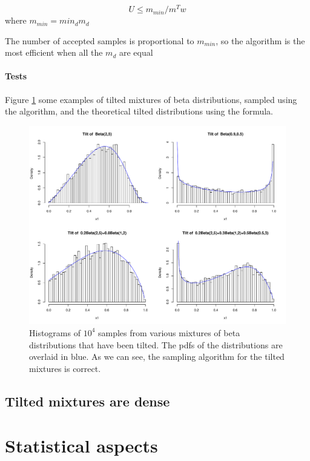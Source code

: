 \documentclass[10pt]{report}
\begin{document}
$$
U\leq m_{min}/m^Tw
$$
where $m_{min} = min_d m_d$

The number of accepted samples is proportional to $m_{min}$, so the algorithm is the most efficient when all the $m_d$ are equal

\subsubsection{Tests}
Figure \ref{fig:historam_tilt} some examples of tilted mixtures of beta distributions, sampled using the algorithm, and the theoretical tilted distributions using the formula.

\begin{figure}[h]
\centering
\includegraphics[width=\textwidth]{histogram_tilt.pdf}
\caption{Histograms of $10^4$ samples from various mixtures of beta distributions that have been tilted. The pdfs of the distributions are overlaid in blue. As we can see, the sampling algorithm for the tilted mixtures is correct.}
\label{fig:historam_tilt}
\end{figure}




\section{Tilted mixtures are dense}

\chapter{Statistical aspects}
\label{sec:stats}
\end{document}
